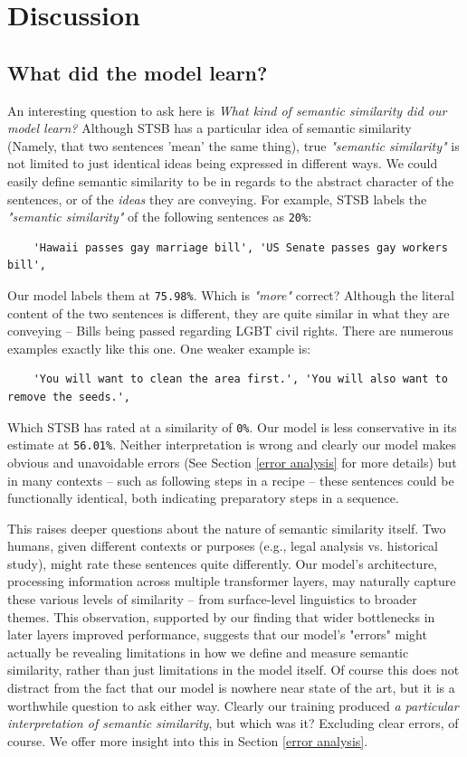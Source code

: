 \documentclass[14pt]{article}
\begin{document}
\section{Discussion}

\subsection{What did the model learn?}
An interesting question to ask here is \textit{What kind of semantic similarity did our model learn?} Although STSB has a particular idea of semantic similarity (Namely, that two sentences 'mean' the same thing), true \textit{"semantic similarity"} is not limited to just identical ideas being expressed in different ways. We could easily define semantic similarity to be in regards to the abstract character of the sentences, or of the \textit{ideas} they are conveying. For example, STSB labels the \textit{"semantic similarity"} of the following sentences as \verb|20%|:
\begin{verbatim}
    'Hawaii passes gay marriage bill', 'US Senate passes gay workers bill',
\end{verbatim}
Our model labels them at \verb|75.98%|. Which is \textit{"more"} correct? Although the literal content of the two sentences is different, they are quite similar in what they are conveying -- Bills being passed regarding LGBT civil rights. There are numerous examples exactly like this one. One weaker example is:
\begin{verbatim}
    'You will want to clean the area first.', 'You will also want to remove the seeds.',
\end{verbatim}
Which STSB has rated at a similarity of \verb|0%|. Our model is less conservative in its estimate at \verb|56.01%|. Neither interpretation is wrong and clearly our model makes obvious and unavoidable errors (See Section \ref{error analysis} for more details) but in many contexts -- such as following steps in a recipe -- these sentences could be functionally identical, both indicating preparatory steps in a sequence.

This raises deeper questions about the nature of semantic similarity itself. Two humans, given different contexts or purposes (e.g., legal analysis vs. historical study), might rate these sentences quite differently. Our model's architecture, processing information across multiple transformer layers, may naturally capture these various levels of similarity -- from surface-level linguistics to broader themes. This observation, supported by our finding that wider bottlenecks in later layers improved performance, suggests that our model's "errors" might actually be revealing limitations in how we define and measure semantic similarity, rather than just limitations in the model itself. Of course this does not distract from the fact that our model is nowhere near state of the art, but it is a worthwhile question to ask either way. Clearly our training produced \textit{a particular interpretation of semantic similarity}, but which was it? Excluding clear errors, of course. We offer more insight into this in Section \ref{error analysis}.
\end{document}

